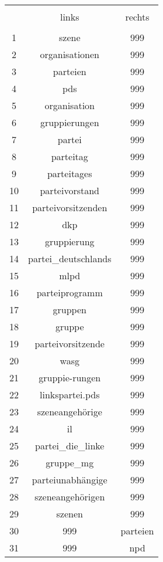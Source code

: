 
\begin{table}[!htbp] \centering 
  \caption{} 
  \label{} 
\begin{tabular}{@{\extracolsep{5pt}} ccc} 
\\[-1.8ex]\hline 
\hline \\[-1.8ex] 
 & links & rechts \\ 
\hline \\[-1.8ex] 
1 & szene & 999 \\ 
2 & organisationen & 999 \\ 
3 & parteien & 999 \\ 
4 & pds & 999 \\ 
5 & organisation & 999 \\ 
6 & gruppierungen & 999 \\ 
7 & partei & 999 \\ 
8 & parteitag & 999 \\ 
9 & parteitages & 999 \\ 
10 & parteivorstand & 999 \\ 
11 & parteivorsitzenden & 999 \\ 
12 & dkp & 999 \\ 
13 & gruppierung & 999 \\ 
14 & partei\_deutschlands & 999 \\ 
15 & mlpd & 999 \\ 
16 & parteiprogramm & 999 \\ 
17 & gruppen & 999 \\ 
18 & gruppe & 999 \\ 
19 & parteivorsitzende & 999 \\ 
20 & wasg & 999 \\ 
21 & gruppie-rungen & 999 \\ 
22 & linkspartei.pds & 999 \\ 
23 & szeneangehörige & 999 \\ 
24 & il & 999 \\ 
25 & partei\_die\_linke & 999 \\ 
26 & gruppe\_mg & 999 \\ 
27 & parteiunabhängige & 999 \\ 
28 & szeneangehörigen & 999 \\ 
29 & szenen & 999 \\ 
30 & 999 & parteien \\ 
31 & 999 & npd \\ 

\end{tabular}
\end{table}
